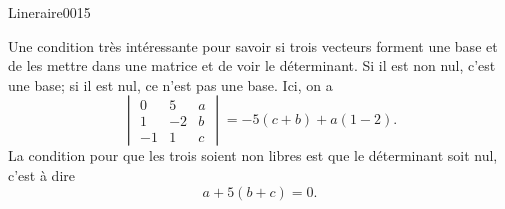 \begin{corrige}{Lineraire0015}

	Une condition très intéressante pour savoir si trois vecteurs forment une base et de les mettre dans une matrice et de voir le déterminant. Si il est non nul, c'est une base; si il est nul, ce n'est pas une base. Ici, on a
	\begin{equation}
		\begin{vmatrix}
			0	&	5	&	a	\\
			1	&	-2	&	b	\\
			-1	&	1	&	c
		\end{vmatrix}=
		-5(c+b)+a(1-2).
	\end{equation}
	La condition pour que les trois soient non libres est que le déterminant soit nul, c'est à dire
	\begin{equation}
		a+5(b+c)=0.
	\end{equation}
	

\end{corrige}
